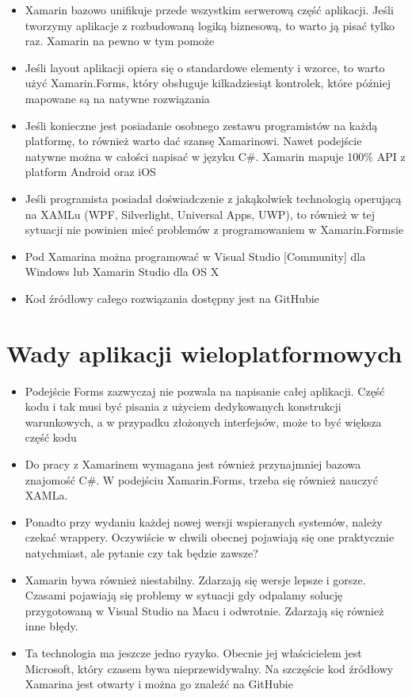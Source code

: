 \documentclass[brudnopis]{xmgr}
\begin{document}
\begin{itemize}
\item
Xamarin bazowo unifikuje przede wszystkim serwerową część aplikacji. Jeśli tworzymy aplikacje z rozbudowaną logiką biznesową, to warto ją pisać tylko raz. Xamarin na pewno w tym pomoże
\item
Jeśli layout aplikacji opiera się o standardowe elementy i wzorce, to warto użyć Xamarin.Forms, który obsługuje kilkadziesiąt kontrolek, które później mapowane są na natywne rozwiązania
\item
Jeśli konieczne jest posiadanie osobnego zestawu programistów na każdą platformę, to również warto dać szansę Xamarinowi. Nawet podejście natywne można w całości napisać w języku C\#. Xamarin mapuje 100\% API z platform Android oraz iOS
\item
Jeśli programista posiadał doświadczenie z jakąkolwiek technologią operującą na XAMLu (WPF, Silverlight, Universal Apps, UWP), to również w tej sytuacji nie powinien mieć problemów z programowaniem w Xamarin.Formsie
\item
Pod Xamarina można programować w Visual Studio [Community] dla Windows lub Xamarin Studio dla OS X
\item
Kod źródłowy całego rozwiązania dostępny jest na GitHubie
\end{itemize}

\section{Wady aplikacji wieloplatformowych}

\begin{itemize}
\item
Podejście Forms zazwyczaj nie pozwala na napisanie całej aplikacji. Część kodu i tak musi być pisania z użyciem dedykowanych konstrukcji warunkowych, a w przypadku złożonych interfejsów, może to być większa część kodu
\item
Do pracy z Xamarinem wymagana jest również przynajmniej bazowa znajomość C\#. W podejściu Xamarin.Forms, trzeba się również nauczyć XAMLa.
\item
Ponadto przy wydaniu każdej nowej wersji wspieranych systemów, należy czekać wrappery. Oczywiście w chwili obecnej pojawiają się one praktycznie natychmiast, ale pytanie czy tak będzie zawsze?
\item
Xamarin bywa również niestabilny. Zdarzają się wersje lepsze i gorsze. Czasami pojawiają się problemy w sytuacji gdy odpalamy solucję przygotowaną w Visual Studio na Macu i odwrotnie. Zdarzają się również inne błędy.
\item
Ta technologia ma jeszcze jedno ryzyko. Obecnie jej właścicielem jest Microsoft, który czasem bywa nieprzewidywalny. Na szczęście kod źródłowy Xamarina jest otwarty i można go znaleźć na GitHubie

\end{itemize}
\end{document}
